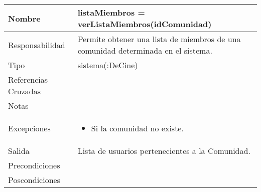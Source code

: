 \documentclass{article}
\begin{document}
\begin{table}[h]
\begin{tabular}{|l|l|l|l|l|l|}
\hline
\multicolumn{2}{|p{3cm}|}{Nombre} & \multicolumn{4}{p{10cm}|}{\textbf{listaMiembros = verListaMiembros(idComunidad)}}\\
\hline
\multicolumn{2}{|p{3cm}|}{Responsabilidad} & \multicolumn{4}{p{10cm}|}{Permite  obtener una lista de miembros de una comunidad determinada en el sistema.} \\
\hline
\multicolumn{2}{|p{3cm}|}{Tipo} & \multicolumn{4}{p{10cm}|}{sistema(:DeCine)} \\
\hline
\multicolumn{2}{|p{3cm}|}{Referencias Cruzadas} & \multicolumn{4}{p{10cm}|}{} \\
\hline
\multicolumn{2}{|p{3cm}|}{Notas} & \multicolumn{4}{p{10cm}|}{} \\
\hline
\multicolumn{2}{|p{3cm}|}{Excepciones} & \multicolumn{4}{p{10cm}|}{\begin{itemize}
\item Si la comunidad no existe.
\end{itemize}} \\
\hline
\multicolumn{2}{|p{3cm}|}{Salida} & \multicolumn{4}{p{10cm}|}{Lista de usuarios pertenecientes a la Comunidad.} \\
\hline
\multicolumn{2}{|p{3cm}|}{Precondiciones} & \multicolumn{4}{p{10cm}|}{} \\
\hline
\multicolumn{2}{|p{3cm}|}{Poscondiciones} & \multicolumn{4}{p{10cm}|}{} \\
\hline
\end{tabular}
\end{table}
\end{document}
